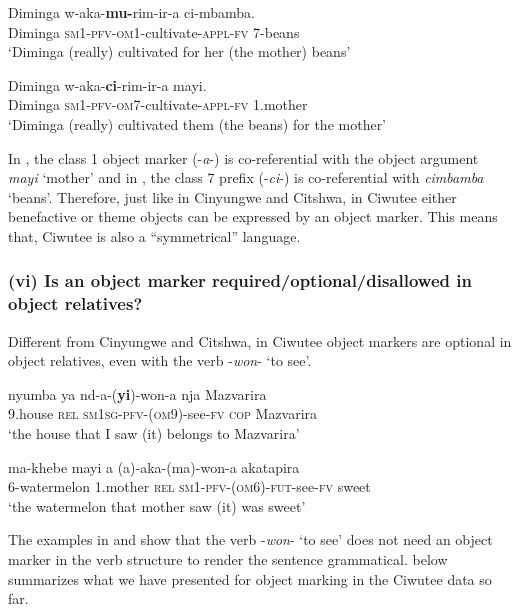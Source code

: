 \documentclass[output=paper]{langscibook}
\begin{document}
\ex\label{ex:ngunga:47b} \gll Diminga  w-aka-\textbf{mu-}rim-ir-a      ci-mbamba.\\
Diminga  {\textsc{sm1}-\textsc{pfv}-\textsc{om}1}{}-cultivate-{\textsc{appl}-\textsc{fv}}   {7}{}-beans\\
\glt ‘Diminga (really) cultivated for her (the mother) beans’

\ex\label{ex:ngunga:47c} \gll Diminga  w-aka-\textbf{ci}{}-rim-ir-a    mayi.\\
      Diminga  {\textsc{sm1}-\textsc{pfv}-\textsc{om}7}{}-cultivate-{\textsc{appl}-\textsc{fv}}  {1.}mother\\
\glt      ‘Diminga (really) cultivated them (the beans) for the mother’
    \z
\z

In , the class 1 object marker (-\textit{a}{}-) is co-referential with the object argument \textit{mayi} ‘mother’ and in , the class 7 prefix (-\textit{ci}-) is co-referential with \textit{cimbamba} ‘beans’. Therefore, just like in Cinyungwe and Citshwa, in Ciwutee either benefactive or theme objects can be expressed by an object marker. This means that, Ciwutee is also a ``symmetrical'' language.  

\subsubsection{(vi) Is an object marker required/optional/disallowed in object relatives?}

Different from Cinyungwe and Citshwa, in Ciwutee object markers are optional in object relatives, even with the verb -\textit{won}{}- ‘to see’. 

\ea\label{ex:ngunga:48}
\ea\label{ex:ngunga:48a} \gll nyumba  ya nd-a-(\textbf{yi})-won-a  nja  Mazvarira\\
9.house  \textsc{rel} {\textsc{sm1sg}}-{\textsc{pfv}}{}-({\textsc{om}9}){}-see-{\textsc{fv}}  \textsc{cop}  Mazvarira\\
\glt ‘the house that I saw (it) belongs to Mazvarira’  

\ex\label{ex:ngunga:48b} \gll ma-khebe    mayi    a (a)-aka-(ma)-won-a  akatapira\\
6-watermelon    1.mother \textsc{rel} {\textsc{sm1}-\textsc{pfv}-(\textsc{om}6)-\textsc{fut}}{}-see-{\textsc{fv}}  sweet\\
\glt ‘the watermelon that mother saw (it) was sweet’
    \z
\z

The examples in  and  show that the verb -\textit{won}{}- ‘to see’ does not need an object marker in the verb structure to render the sentence grammatical.  below summarizes what we have presented for object marking in the Ciwutee data so far.  
\end{document}
